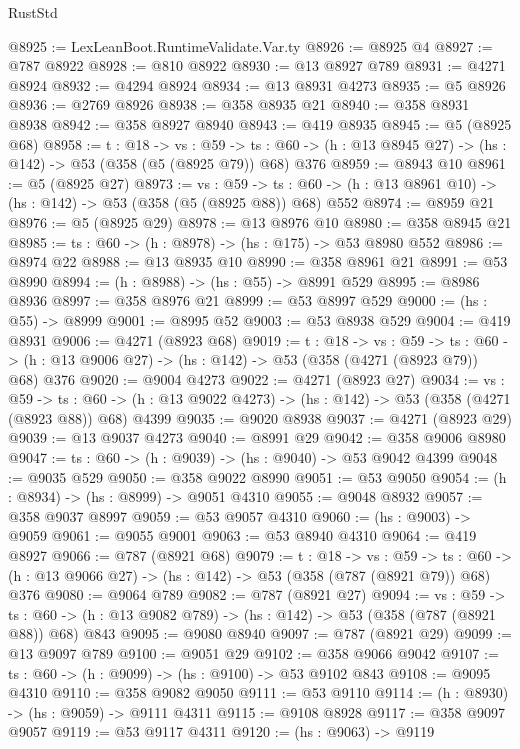 \begin{lexlean}{RustStd}
\begin{coremodule}
@8925 := LexLeanBoot.RuntimeValidate.Var.ty
@8926 := @8925 @4
@8927 := @787 @8922
@8928 := @810 @8922
@8930 := @13 @8927 @789
@8931 := @4271 @8924
@8932 := @4294 @8924
@8934 := @13 @8931 @4273
@8935 := @5 @8926
@8936 := @2769 @8926
@8938 := @358 @8935 @21
@8940 := @358 @8931 @8938
@8942 := @358 @8927 @8940
@8943 := @419 @8935
@8945 := @5 (@8925 @68)
@8958 := {t : @18} ->
  {vs : @59} ->
  {ts : @60} -> (h : @13 @8945 @27) -> (hs : @142) -> @53 (@358 (@5 (@8925 @79)) @68) @376
@8959 := @8943 @10
@8961 := @5 (@8925 @27)
@8973 := {vs : @59} ->
  {ts : @60} -> (h : @13 @8961 @10) -> (hs : @142) -> @53 (@358 (@5 (@8925 @88)) @68) @552
@8974 := @8959 @21
@8976 := @5 (@8925 @29)
@8978 := @13 @8976 @10
@8980 := @358 @8945 @21
@8985 := {ts : @60} -> (h : @8978) -> (hs : @175) -> @53 @8980 @552
@8986 := @8974 @22
@8988 := @13 @8935 @10
@8990 := @358 @8961 @21
@8991 := @53 @8990
@8994 := (h : @8988) -> (hs : @55) -> @8991 @529
@8995 := @8986 @8936
@8997 := @358 @8976 @21
@8999 := @53 @8997 @529
@9000 := (hs : @55) -> @8999
@9001 := @8995 @52
@9003 := @53 @8938 @529
@9004 := @419 @8931
@9006 := @4271 (@8923 @68)
@9019 := {t : @18} ->
  {vs : @59} ->
  {ts : @60} -> (h : @13 @9006 @27) -> (hs : @142) -> @53 (@358 (@4271 (@8923 @79)) @68) @376
@9020 := @9004 @4273
@9022 := @4271 (@8923 @27)
@9034 := {vs : @59} ->
  {ts : @60} -> (h : @13 @9022 @4273) -> (hs : @142) -> @53 (@358 (@4271 (@8923 @88)) @68) @4399
@9035 := @9020 @8938
@9037 := @4271 (@8923 @29)
@9039 := @13 @9037 @4273
@9040 := @8991 @29
@9042 := @358 @9006 @8980
@9047 := {ts : @60} -> (h : @9039) -> (hs : @9040) -> @53 @9042 @4399
@9048 := @9035 @529
@9050 := @358 @9022 @8990
@9051 := @53 @9050
@9054 := (h : @8934) -> (hs : @8999) -> @9051 @4310
@9055 := @9048 @8932
@9057 := @358 @9037 @8997
@9059 := @53 @9057 @4310
@9060 := (hs : @9003) -> @9059
@9061 := @9055 @9001
@9063 := @53 @8940 @4310
@9064 := @419 @8927
@9066 := @787 (@8921 @68)
@9079 := {t : @18} ->
  {vs : @59} ->
  {ts : @60} -> (h : @13 @9066 @27) -> (hs : @142) -> @53 (@358 (@787 (@8921 @79)) @68) @376
@9080 := @9064 @789
@9082 := @787 (@8921 @27)
@9094 := {vs : @59} ->
  {ts : @60} -> (h : @13 @9082 @789) -> (hs : @142) -> @53 (@358 (@787 (@8921 @88)) @68) @843
@9095 := @9080 @8940
@9097 := @787 (@8921 @29)
@9099 := @13 @9097 @789
@9100 := @9051 @29
@9102 := @358 @9066 @9042
@9107 := {ts : @60} -> (h : @9099) -> (hs : @9100) -> @53 @9102 @843
@9108 := @9095 @4310
@9110 := @358 @9082 @9050
@9111 := @53 @9110
@9114 := (h : @8930) -> (hs : @9059) -> @9111 @4311
@9115 := @9108 @8928
@9117 := @358 @9097 @9057
@9119 := @53 @9117 @4311
@9120 := (hs : @9063) -> @9119

\end{coremodule}
\end{lexlean}
